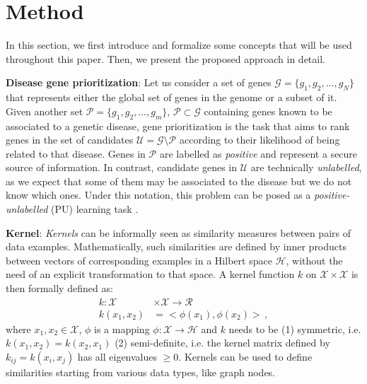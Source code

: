 \section{Method}
In this section, we first introduce and formalize some concepts that will be used throughout this paper. Then, we present the proposed approach in detail.

\textbf{Disease gene prioritization}: Let us consider a set of genes $\mathcal{G} = \lbrace g_1, g_2, \ldots, g_N \rbrace$ that represents either the global set of genes in the genome or a subset of it. Given another set $\mathcal{P} = \lbrace g_1, g_2, \ldots, g_m \rbrace, \, \mathcal{P} \subset \mathcal{G}$ containing genes known to be associated to a genetic disease, gene prioritization is the task that aims to rank genes in the set of candidates $\mathcal{U} = \mathcal{G} \setminus \mathcal{P}$ according to their likelihood of being related to that disease. Genes in $\mathcal{P}$ are labelled as \emph{positive} and represent a secure source of information. In contrast, candidate genes in $\mathcal{U}$ are technically \emph{unlabelled}, as we expect that some of them may be associated to the disease but we do not know which ones. Under this notation, this problem can be posed as a \emph{positive-unlabelled} (PU) learning task \cite{prodige,chapelle}.

\textbf{Kernel}: \textit{Kernels} can be informally seen as similarity measures between pairs of data examples. Mathematically, such similarities are defined by inner products between vectors of corresponding examples in a Hilbert space $\mathcal{H}$, without the need of an explicit transformation to that space. A kernel function $k$ on $\mathcal{X} \times \mathcal{X} $ is then formally defined as:
\begin{align*}
	k: \mathcal{X} &\times \mathcal{X} \longrightarrow \mathcal{R}\\
	k(x_{1}, x_{2}) &= \mathcal{<}\phi(x_{1}),\phi(x_{2})\mathcal{>} \, ,
\end{align*}
where $x_1, x_2 \in \mathcal{X}$, $\phi$ is a mapping $\phi:\mathcal{X} \longrightarrow \mathcal{H}$ and $k$ needs to be (1) symmetric, i.e. $k(x_1,x_2)=k(x_2,x_1)$ (2) semi-definite, i.e. the kernel matrix defined by $k_{ij} = k(x_i, x_j)$ has all eigenvalues $\geq 0$. Kernels can be used to define similarities starting from various data types, like graph nodes.

